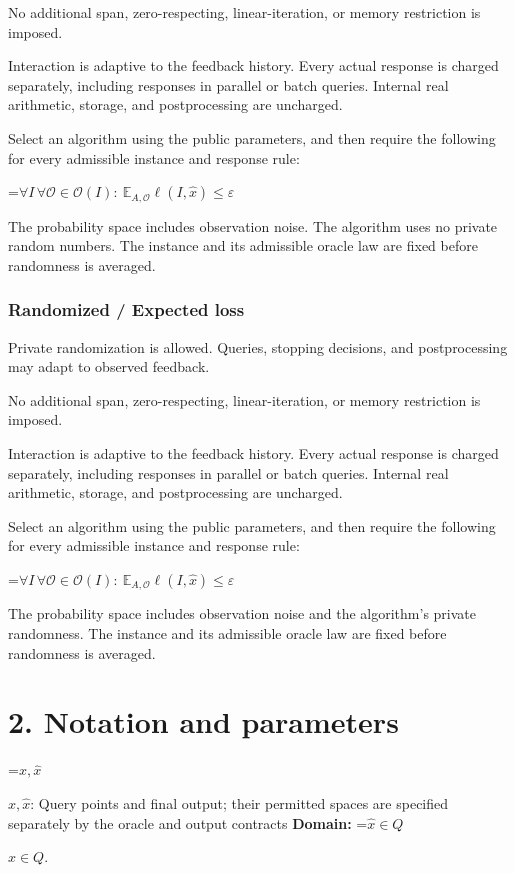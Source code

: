 \documentclass[10pt,a4paper]{article}
\newcommand{\AtlasMath}[1]{\par\begingroup\centering\setbox0=\hbox{$\displaystyle #1$}\ifdim\wd0>1.4\linewidth\typeout{ATLAS WIDE FORMULA: \the\wd0}\fi\ifdim\wd0>\linewidth\resizebox{\linewidth}{!}{\box0}\else\box0\fi\par\endgroup}
\newcommand{\AtlasInlineMath}[1]{\begingroup\setbox0=\hbox{$#1$}\ifdim\wd0>.4\linewidth\endgroup\AtlasMath{#1}\else\endgroup$#1$\fi}
\begin{document}
No additional span, zero-respecting, linear-iteration, or memory restriction is imposed.

Interaction is adaptive to the feedback history. Every actual response is charged separately, including responses in parallel or batch queries. Internal real arithmetic, storage, and postprocessing are uncharged.

Select an algorithm using the public parameters, and then require the following for every admissible instance and response rule:


\AtlasMath{\forall I\,\forall\mathcal{O}\in\mathcal{O}(I):\ \mathbb{E}_{A,\mathcal{O}}\ell(I,\widehat{x})\le\varepsilon}


The probability space includes observation noise. The algorithm uses no private random numbers. The instance and its admissible oracle law are fixed before randomness is averaged.

\subsubsection{Randomized / Expected loss}
Private randomization is allowed. Queries, stopping decisions, and postprocessing may adapt to observed feedback.

No additional span, zero-respecting, linear-iteration, or memory restriction is imposed.

Interaction is adaptive to the feedback history. Every actual response is charged separately, including responses in parallel or batch queries. Internal real arithmetic, storage, and postprocessing are uncharged.

Select an algorithm using the public parameters, and then require the following for every admissible instance and response rule:


\AtlasMath{\forall I\,\forall\mathcal{O}\in\mathcal{O}(I):\ \mathbb{E}_{A,\mathcal{O}}\ell(I,\widehat{x})\le\varepsilon}


The probability space includes observation noise and the algorithm's private randomness. The instance and its admissible oracle law are fixed before randomness is averaged.

\section{2. Notation and parameters}
\AtlasInlineMath{x,\widehat{x}}: Query points and final output; their permitted spaces are specified separately by the oracle and output contracts \textbf{Domain:} \AtlasInlineMath{\widehat{x}\in Q}.
\end{document}
